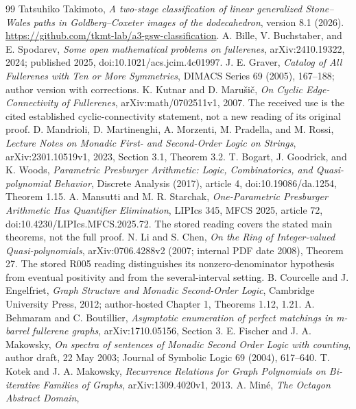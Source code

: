 \documentclass[11pt]{amsart}
\theoremstyle{definition}\newtheorem{definition}{Definition}
\begin{document}
\clearpage
\begin{thebibliography}{99}
 Tatsuhiko Takimoto,
\emph{A two-stage classification of linear generalized Stone--Wales paths in
Goldberg--Coxeter images of the dodecahedron}, version 8.1 (2026).
{\url{https://github.com/tkmt-lab/a3-gsw-classification}}.
 A. Bille, V. Buchstaber, and E. Spodarev,
\emph{Some open mathematical problems on fullerenes}, arXiv:2410.19322,
2024; published 2025, doi:10.1021/acs.jcim.4c01997.
 J. E. Graver,
\emph{Catalog of All Fullerenes with Ten or More Symmetries},
DIMACS Series 69 (2005), 167--188; author version with corrections.
 K. Kutnar and D. Maru\v{s}i\v{c},
\emph{On Cyclic Edge-Connectivity of Fullerenes}, arXiv:math/0702511v1,
2007. The received use is the cited established cyclic-connectivity
statement, not a new reading of its original proof.
 D. Mandrioli, D. Martinenghi, A. Morzenti,
M. Pradella, and M. Rossi,
\emph{Lecture Notes on Monadic First- and Second-Order Logic on Strings},
arXiv:2301.10519v1, 2023, Section 3.1, Theorem 3.2.
 T. Bogart, J. Goodrick, and K. Woods,
\emph{Parametric Presburger Arithmetic: Logic, Combinatorics, and
Quasi-polynomial Behavior}, Discrete Analysis (2017), article 4,
doi:10.19086/da.1254, Theorem 1.15.
 A. Mansutti and M. R. Starchak,
\emph{One-Parametric Presburger Arithmetic Has Quantifier Elimination},
LIPIcs 345, MFCS 2025, article 72, doi:10.4230/LIPIcs.MFCS.2025.72.
The stored reading covers the stated main theorems, not the full proof.
 N. Li and S. Chen,
\emph{On the Ring of Integer-valued Quasi-polynomials},
arXiv:0706.4288v2 (2007; internal PDF date 2008), Theorem 27.
The stored R005 reading distinguishes its nonzero-denominator hypothesis
from eventual positivity and from the several-interval setting.
 B. Courcelle and J. Engelfriet,
\emph{Graph Structure and Monadic Second-Order Logic}, Cambridge
University Press, 2012; author-hosted Chapter 1, Theorems 1.12, 1.21.
 A. Behmaram and C. Boutillier,
\emph{Asymptotic enumeration of perfect matchings in m-barrel fullerene graphs},
arXiv:1710.05156, Section 3.
 E. Fischer and J. A. Makowsky,
\emph{On spectra of sentences of Monadic Second Order Logic with counting},
author draft, 22 May 2003; Journal of Symbolic Logic 69 (2004), 617--640.
 T. Kotek and J. A. Makowsky,
\emph{Recurrence Relations for Graph Polynomials on Bi-iterative
Families of Graphs}, arXiv:1309.4020v1, 2013.
 A. Min\'e, \emph{The Octagon Abstract Domain},

\end{thebibliography}
\end{document}
